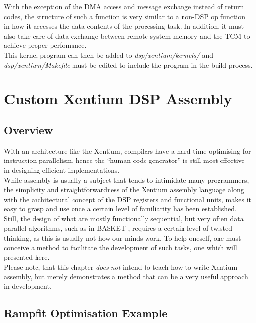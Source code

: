 \noindent
With the exception of the \gls{DMA} access and message exchange instead of return
codes, the structure of such a function is very similar to a non-DSP op function
in how it accesses the data contents of the processing task.
In addition, it must also take care of data exchange between remote system
memory and the \gls{TCM} to achieve proper perfomance.
\\

\noindent
This kernel program can then be added to \emph{dsp/xentium/kernels/} and
\emph{dsp/xentium/Makefile} must be edited to include the program in the
build process.



\chapter {Custom Xentium DSP Assembly}

\section{Overview}

With an architecture like the \gls{Xentium}, compilers have a hard time
optimising for instruction parallelism, hence the ``human code generator'' is
still most effective in designing efficient implementations. \\

While assembly is usually a subject that tends to intimidate many programmers,
the simplicity and straightforwardness of the Xentium assembly
language \cite{XenUsrGuide} along with the architectural concept of the DSP
registers and functional units, makes it easy to grasp and use once a certain
level of familiarity has been established. \\

Still, the design of what are mostly functionally sequential, but very often
data parallel algorithms, such as in BASKET \cite{BASKET}, requires a
certain level of twisted thinking, as this is usually not how our minds work.
To help oneself, one must conceive a method to facilitate the development of
such tasks, one which will presented here. \\

Please note, that this chapter \emph{does not} intend to teach how to write
Xentium assembly, but merely demonstrates a method that can be a very useful
approach in development.


\section{Rampfit Optimisation Example}


